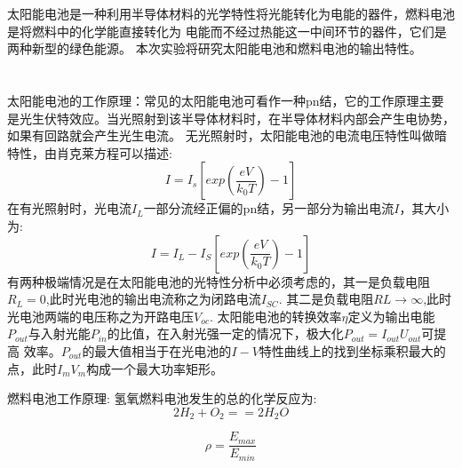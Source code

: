 ﻿\documentclass[10.5pt]{ctexart}
\begin{document}
\title{\textbf{}} %
\author{}
\maketitle
\section{\textbf{}}
太阳能电池是一种利用半导体材料的光学特性将光能转化为电能的器件，燃料电池是将燃料中的化学能直接转化为
电能而不经过热能这一中间环节的器件，它们是两种新型的绿色能源。
本次实验将研究太阳能电池和燃料电池的输出特性。
\section{\textbf{}}

太阳能电池的工作原理：常见的太阳能电池可看作一种pn结，它的工作原理主要是光生伏特效应。当光照射到该半导体材料时，在半导体材料内部会产生电协势，如果有回路就会产生光生电流。
无光照射时，太阳能电池的电流电压特性叫做暗特性，由肖克莱方程可以描述:
\begin{equation}
I=I_s [exp(\frac{eV}{k_0 T})-1]
\end{equation}
在有光照射时，光电流$I_L$一部分流经正偏的pn结，另一部分为输出电流$I$，其大小为:
\begin{equation}
I=I_L-I_S [exp(\frac{eV}{k_0 T})-1]
\end{equation}
有两种极端情况是在太阳能电池的光特性分析中必须考虑的，其一是负载电阻$R_L=0$,此时光电池的输出电流称之为闭路电流$I_{SC}$.
其二是负载电阻$RL \rightarrow \infty $,此时光电池两端的电压称之为开路电压$V_{oc}$.
太阳能电池的转换效率$\eta$定义为输出电能$P_{out}$与入射光能$P_{in}$的比值，在入射光强一定的情况下，极大化$P_{out}=I_{out} U_{out}$可提高
效率。$P_{out}$的最大值相当于在光电池的$I-V$特性曲线上的找到坐标乘积最大的点，此时$I_m V_m$构成一个最大功率矩形。

燃料电池工作原理:
氢氧燃料电池发生的总的化学反应为:
\begin{equation}
2H_2 + O_2 ==2H_2 O
\end{equation}

\begin{equation}
\rho=\frac{E_{max}}{E_{min}}
\end{equation}

\section{\textbf{}}
\end{document}
